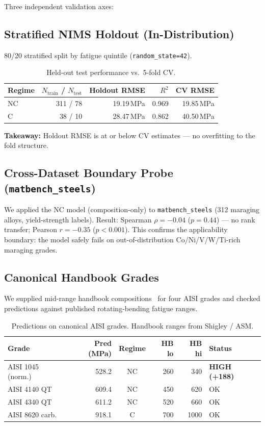 \documentclass[10pt,a4paper]{article} %
\begin{document}
Three independent validation axes:

\subsection{Stratified NIMS Holdout (In-Distribution)}
80/20 stratified split by fatigue quintile (\texttt{random\_state=42}).

\begin{table}[H]
\centering
\caption{Held-out test performance vs.\ 5-fold CV.}
\label{tab:holdout}
\begin{tabular}{lrrrr}
\toprule
\textbf{Regime} & \textbf{$N_{\text{train}}$ / $N_{\text{test}}$} & \textbf{Holdout RMSE} & \textbf{$R^2$} & \textbf{CV RMSE} \\
\midrule
NC & 311 / 78 & 19.19\,MPa & 0.969 & 19.85\,MPa \\
C  & 38 / 10  & 28.47\,MPa & 0.862 & 40.50\,MPa \\
\bottomrule
\end{tabular}
\end{table}

\textbf{Takeaway:} Holdout RMSE is at or below CV estimates — no overfitting to the fold structure.

\subsection{Cross-Dataset Boundary Probe (\texttt{matbench\_steels})}
We applied the NC model (composition-only) to \texttt{matbench\_steels} (312 maraging alloys, yield-strength labels). Result: Spearman $\rho=-0.04$ ($p=0.44$) — no rank transfer; Pearson $r=-0.35$ ($p<0.001$). This confirms the applicability boundary: the model safely fails on out-of-distribution Co/Ni/V/W/Ti-rich maraging grades.

\subsection{Canonical Handbook Grades}
We supplied mid-range handbook compositions~\cite{shigley} for four AISI grades and checked predictions against published rotating-bending fatigue ranges.

\begin{table}[H]
\centering
\caption{Predictions on canonical AISI grades. Handbook ranges from Shigley / ASM.}
\label{tab:grades}
\begin{tabular}{lrcrrl}
\toprule
\textbf{Grade} & \textbf{Pred (MPa)} & \textbf{Regime} & \textbf{HB lo} & \textbf{HB hi} & \textbf{Status} \\
\midrule
AISI 1045 (norm.)    & 528.2 & NC & 260 & 340  & \textbf{HIGH (+188)} \\
AISI 4140 QT         & 609.4 & NC & 450 & 620  & OK                   \\
AISI 4340 QT         & 611.2 & NC & 520 & 660  & OK                   \\
AISI 8620 carb.      & 918.1 & C  & 700 & 1000 & OK                   \\
\bottomrule
\end{tabular}
\end{table}
\end{document}
